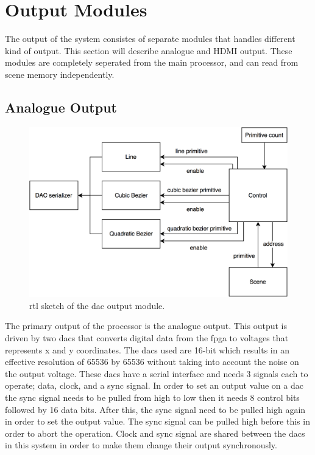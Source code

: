 \chapter{Output Modules}
\label{chap:Output}

The output of the system consistes of separate modules that handles different kind of output. This section will describe analogue and HDMI output.
These modules are completely seperated from the main processor, and can read from scene memory independently.

\section{Analogue Output}

\begin{figure}[h!]
    \includegraphics[width=\linewidth]{images/dac-output.png}
    \caption{\gls{rtl} sketch of the \vthreek \gls{dac} output module.}
    \label{fig:dac-output}
\end{figure}

The primary output of the processor is the analogue output.
This output is driven by two \gls{dac}s that converts digital data from the \gls{fpga} to voltages that represents x and y coordinates.
The \gls{dac}s used are 16-bit which results in an effective resolution of 65536 by 65536 without taking into account the noise on the output voltage.
These \gls{dac}s have a serial interface and needs 3 signals each to operate; data, clock, and a sync signal.
In order to set an output value on a \gls{dac} the sync signal needs to be pulled from high to low then it needs 8 control bits followed by 16 data bits.
After this, the sync signal need to be pulled high again in order to set the output value.
The sync signal can be pulled high before this in order to abort the operation.
Clock and sync signal are shared between the \gls{dac}s in this system in order to make them change their output synchronously.


